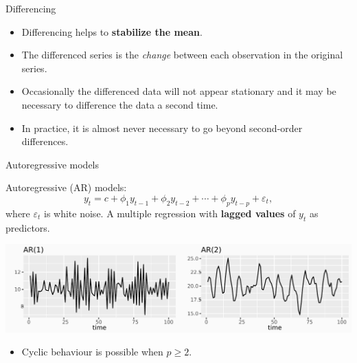 \documentclass[
  14pt,
  ignorenonframetext,
  aspectratio=169,
]{beamer}
\providecommand{\tightlist}{%
  \setlength{\itemsep}{0pt}\setlength{\parskip}{0pt}}\usepackage{longtable,booktabs,array}
\begin{document}
\begin{frame}{Differencing}
\protect\hypertarget{differencing}{}
\fontsize{13}{15}\sf

\begin{itemize}
\tightlist
\item
  Differencing helps to \textbf{stabilize the mean}.
\item
  The differenced series is the \emph{change} between each observation
  in the original series.
\item
  Occasionally the differenced data will not appear stationary and it
  may be necessary to difference the data a second time.
\item
  In practice, it is almost never necessary to go beyond second-order
  differences.
\end{itemize}
\end{frame}

\begin{frame}{Autoregressive models}
\protect\hypertarget{autoregressive-models}{}
\begin{block}{Autoregressive (AR) models:}\vspace*{-0.3cm}
$$
  y_{t} = c + \phi_{1}y_{t - 1} + \phi_{2}y_{t - 2} + \cdots + \phi_{p}y_{t - p} + \varepsilon_{t},
$$
where $\varepsilon_t$ is white noise. A multiple regression with \textbf{lagged values} of $y_t$ as predictors.
\end{block}

\includegraphics{04_arima_files/figure-beamer/arp-1.pdf}

\vspace*{-0.4cm}

\begin{itemize}
\tightlist
\item
  Cyclic behaviour is possible when \(p\ge 2\).
\end{itemize}
\end{frame}
\end{document}
